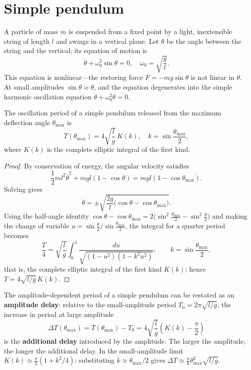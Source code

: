 \section{Simple pendulum}

\begin{definition}\label{def:simple_pendulum}
A particle of mass $m$ is suspended from a fixed point by a light, inextensible string of length $l$ and swings in a vertical plane. Let $\theta$ be the angle between the string and the vertical; its equation of motion is
\[
\ddot{\theta} + \omega_0^2 \sin\theta = 0, \quad \omega_0 = \sqrt{\frac{g}{l}}.
\]
This equation is nonlinear---the restoring force $F = -mg\sin\theta$ is not linear in $\theta$. At small amplitudes $\sin\theta \approx \theta$, and the equation degenerates into the simple harmonic oscillation equation $\ddot{\theta} + \omega_0^2 \theta = 0$.
\end{definition}

\begin{theorem}\label{thm:pendulum_exact_period}
The oscillation period of a simple pendulum released from the maximum deflection angle $\theta_{\max}$ is
\[
T(\theta_{\max}) = 4\sqrt{\frac{l}{g}} \, K(k), \quad k = \sin\frac{\theta_{\max}}{2},
\]
where $K(k)$ is the complete elliptic integral of the first kind.
\end{theorem}

\begin{proof}
By conservation of energy, the angular velocity satisfies
\[
\frac{1}{2}ml^2\dot\theta^2 + mgl(1-\cos\theta) = mgl(1-\cos\theta_{\max}).
\]
Solving gives
\[
\dot\theta = \pm \sqrt{\frac{2g}{l}\big(\cos\theta - \cos\theta_{\max}\big)}.
\]
Using the half-angle identity $\cos\theta - \cos\theta_{\max} = 2\big(\sin^2\frac{\theta_{\max}}{2} - \sin^2\frac{\theta}{2}\big)$ and making the change of variable $u = \sin\frac{\theta}{2}/\sin\frac{\theta_{\max}}{2}$, the integral for a quarter period becomes
\[
\frac{T}{4} = \sqrt{\frac{l}{g}} \int_0^1 \frac{du}{\sqrt{(1-u^2)(1-k^2u^2)}}, \qquad k = \sin\frac{\theta_{\max}}{2},
\]
that is, the complete elliptic integral of the first kind $K(k)$; hence $T = 4\sqrt{l/g}\, K(k)$.
\end{proof}

\begin{definition}\label{def:pendulum_amplitude_delay}
The amplitude-dependent period of a simple pendulum can be restated as an \textbf{amplitude delay}: relative to the small-amplitude period $T_0 = 2\pi\sqrt{l/g}$, the increase in period at large amplitude
\[
\Delta T(\theta_{\max}) = T(\theta_{\max}) - T_0 = 4\sqrt{\frac{l}{g}}\left(K(k) - \frac{\pi}{2}\right)
\]
is the \textbf{additional delay} introduced by the amplitude. The larger the amplitude, the longer the additional delay. In the small-amplitude limit $K(k) \approx \frac{\pi}{2}(1 + k^2/4)$; substituting $k \approx \theta_{\max}/2$ gives $\Delta T \approx \frac{\pi}{8}\theta_{\max}^2\sqrt{l/g}$.
\end{definition}

